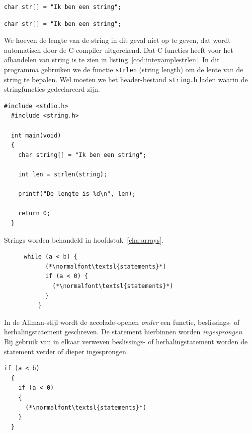 \documentclass[12pt,a4paper,final,twoside,fleqn]{book}
\begin{document}
\begin{lstlisting}[caption=Voorbeeld van een string.]
  char str[] = "Ik ben een string";
\end{lstlisting}




\begin{lstlisting}[caption=Voorbeeld van een string.]
  char str[] = "Ik ben een string";
\end{lstlisting}

We hoeven de lengte van de string in dit geval niet op te geven, dat wordt automatisch door de C-compiler uitgerekend. Dat C functies heeft voor het afhandelen van string is te zien in listing~\ref{cod:intexamplestrlen}. In dit programma gebruiken we de functie \lstinline|strlen| (string length) om de lente van de string te bepalen. Wel moeten we het header-bestand \lstinline|string.h| laden waarin de stringfuncties gedeclareerd zijn.

\begin{lstlisting}[caption=Voorbeeld van een stringfunctie.,label=cod:intexamplestrlen]
  #include <stdio.h>
  #include <string.h>

  int main(void)
  {
    char string[] = "Ik ben een string";

    int len = strlen(string);

    printf("De lengte is %d\n", len);

    return 0;
  }
\end{lstlisting}

Strings worden behandeld in hoofdstuk~\ref{cha:arrays}.

\begin{figure}[!ht]
  \begin{lstlisting}[caption=K\&R-stijl.]
    while (a < b) {
      (*\normalfont\textsl{statements}*)
      if (a < 0) {
        (*\normalfont\textsl{statements}*)
      }
    }
  \end{lstlisting}

\end{figure}
In de Allman-stijl wordt de accolade-openen \textsl{onder} een functie, beslissings- of herhalingstatement geschreven. De statement hierbinnen worden \textsl{ingesprongen}. Bij gebruik van in elkaar verweven beslissings- of herhalingstatement worden de statement verder of dieper ingesprongen.

\begin{lstlisting}[caption=Allman-stijl.]
  if (a < b)
  {
    if (a < 0)
    {
      (*\normalfont\textsl{statements}*)
    }
  }
\end{lstlisting}
\end{document}
